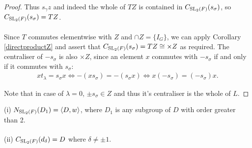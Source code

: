 \begin{proof}
Thus $s_\gamma z$ and indeed the whole of $TZ$ is contained in $ C_{\operatorname{SL}_2(F)}(s_\sigma)$, so $C_{\operatorname{SL}_2(F)}(s_\sigma) = TZ$. \\
\\
Since $T$ commutes elementwise with $Z$ and $\cap Z = \{ I_G \}$, we can apply Corollary \ref{directproductZ} and assert that $C_{\operatorname{SL}_2(F)}(s_\sigma) = TZ \cong \times Z$ as required. The centraliser of $\minus s_\sigma$ is also $\times Z$, since an element $x$ commutes with $\minus s_\sigma$ if and only if it commutes with $s_\sigma$:
\begin{align*} 
    xt_\lambda = s_\sigma x \iff \minus(x s_\sigma) = \minus (s_\sigma x) \iff x(\minus s_\sigma) = (\minus s_\sigma)x.
\end{align*}

Note that in case of $\lambda = 0$, $\pm s_\sigma \in Z$ and thus it's centraliser is the whole of $L$.

\end{proof}

\begin{proposition}\label{6.4ii}
(i) $N_{\operatorname{SL}_2(F)}(D_1) = \langle D , w \rangle$, where  $D_1$ is any subgroup of $D$ with order greater than 2. \\
\\
(ii) $C_{\operatorname{SL}_2(F)}(d_\delta)= D$ where $\delta \neq \pm 1$.
\end{proposition}

